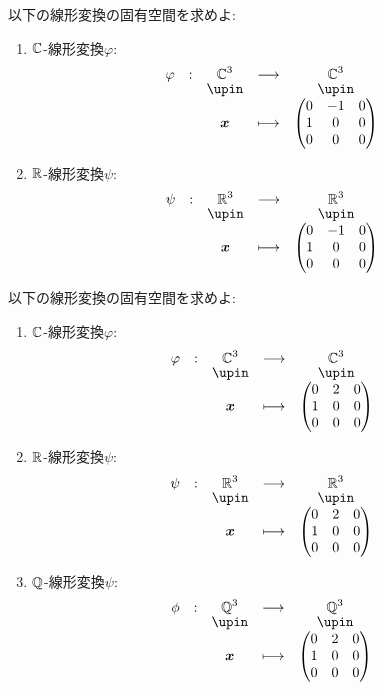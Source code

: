 \begin{quiz}
  以下の線形変換の固有空間を求めよ:
  \begin{enumerate}
  \item $\mathbb{C}$-線形変換$\varphi$:
    \begin{align*}
      \shazo{\varphi}{\CC^3}{\CC^3}
      {\xx}{\begin{pmatrix}0&-1&0\\1&0&0\\0&0&0\end{pmatrix}}
    \end{align*}
  \item $\mathbb{R}$-線形変換$\psi$:
    \begin{align*}
      \shazo{\psi}{\RR^3}{\RR^3}
      {\xx}{\begin{pmatrix}0&-1&0\\1&0&0\\0&0&0\end{pmatrix}}
    \end{align*}
  \end{enumerate}
\end{quiz}

\begin{quiz}
  以下の線形変換の固有空間を求めよ:
  \begin{enumerate}
  \item $\mathbb{C}$-線形変換$\varphi$:
    \begin{align*}
      \shazo{\varphi}{\CC^3}{\CC^3}
      {\xx}{\begin{pmatrix}0&2&0\\1&0&0\\0&0&0\end{pmatrix}}
    \end{align*}
  \item $\mathbb{R}$-線形変換$\psi$:
    \begin{align*}
      \shazo{\psi}{\RR^3}{\RR^3}
      {\xx}{\begin{pmatrix}0&2&0\\1&0&0\\0&0&0\end{pmatrix}}
    \end{align*}
  \item $\mathbb{Q}$-線形変換$\psi$:
    \begin{align*}
      \shazo{\phi}{\QQ^3}{\QQ^3}
      {\xx}{\begin{pmatrix}0&2&0\\1&0&0\\0&0&0\end{pmatrix}}
    \end{align*}
  \end{enumerate}
\end{quiz}

